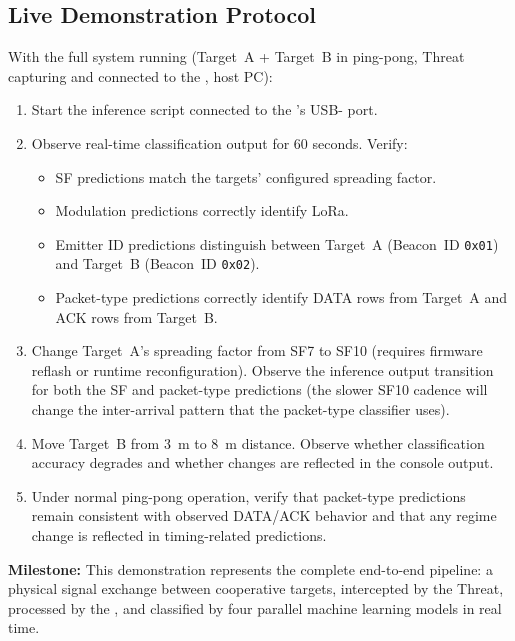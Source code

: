 \documentclass[11pt,letterpaper]{article}
\begin{document}
	\subsection{Live Demonstration Protocol}

	\begin{tcolorbox}[infobox={Exercise: End-to-End Live Classification}]
		With the full system running (Target~A + Target~B in ping-pong, Threat capturing and connected to the \FPGA{}, host PC):
		\begin{enumerate}
			\item Start the inference script connected to the \FPGA{}'s USB-\UART{} port.
			\item Observe real-time classification output for 60 seconds. Verify:
			\begin{itemize}
				\item SF predictions match the targets' configured spreading factor.
				\item Modulation predictions correctly identify LoRa.
				\item Emitter ID predictions distinguish between Target~A (Beacon~ID \texttt{0x01}) and Target~B (Beacon~ID \texttt{0x02}).
				\item Packet-type predictions correctly identify DATA rows from Target~A and ACK rows from Target~B.
			\end{itemize}
			\item Change Target~A's spreading factor from SF7 to SF10 (requires firmware reflash or runtime reconfiguration). Observe the inference output transition for both the SF and packet-type predictions (the slower SF10 cadence will change the inter-arrival pattern that the packet-type classifier uses).
			\item Move Target~B from 3~m to 8~m distance. Observe whether classification accuracy degrades and whether \RSSI{} changes are reflected in the console output.
			\item Under normal ping-pong operation, verify that packet-type predictions remain consistent with observed DATA/ACK behavior and that any regime change is reflected in timing-related predictions.
		\end{enumerate}
		\textbf{Milestone:} This demonstration represents the complete end-to-end pipeline: a physical \RF{} signal exchange between cooperative targets, intercepted by the Threat, processed by the \FPGA{}, and classified by four parallel machine learning models in real time.
	\end{tcolorbox}
\end{document}

